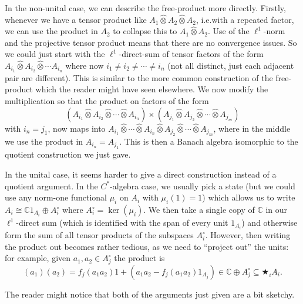 \documentclass[a4paper,11pt]{article}
\newcommand{\proten}{\widehat\otimes}
\theoremstyle{definition}
\begin{document}
In the non-unital case, we can describe the free-product more directly.  Firstly, whenever we have a tensor product like $A_1 \proten A_2 \proten A_2$, i.e.\@ with a repeated factor, we can use the product in $A_2$ to collapse this to $A_1 \proten A_2$.  Use of the $\ell^1$-norm and the projective tensor product means that there are no convergence issues.  So we could just start with the $\ell^1$-direct-sum of tensor factors of the form 
$A_{i_1}\proten A_{i_2}\proten\cdots A_{i_n}$ where now $i_1\not=i_2\not=\cdots\not=i_n$ (not all distinct, just each adjacent pair are different).  This is similar to the more common construction of the free-product which the reader might have seen elsewhere.  We now modify the multiplication so that the product on factors of the form
\[ (A_{i_1}\proten A_{i_2}\proten\cdots\proten A_{i_n}) \times (A_{j_1}\proten A_{j_2}\proten\cdots\proten A_{j_m}) \]
with $i_n = j_1$, now maps into $A_{i_1}\proten\cdots\proten A_{i_n} \proten A_{j_2} \proten\cdots\proten A_{j_m}$, where in the middle we use the product in $A_{i_n} = A_{j_1}$.  This is then a Banach algebra isomorphic to the quotient construction we just gave.

In the unital case, it seems harder to give a direct construction instead of a quotient argument.  In the $C^*$-algebra case, we usually pick a state (but we could use any norm-one functional $\mu_i$ on $A_i$ with $\mu_i(1)=1$) which allows us to write $A_i \cong \mathbb C1_{A_i} \oplus A_i^\circ$ where $A_i^\circ = \ker(\mu_i)$.  We then take a single copy of $\mathbb C$ in our $\ell^1$-direct sum (which is identified with the span of every unit $1_{A_i}$) and otherwise form the sum of all tensor products of the subspaces $A_i^\circ$.  However, then writing the product out becomes rather tedious, as we need to ``project out'' the units: for example, given $a_1, a_2 \in A_{j}^\circ$ the product is
\[ (a_1)(a_2) = f_j(a_1a_2)1 + (a_1a_2 - f_j(a_1a_2)1_{A_j}) \in \mathbb C \oplus A_j^\circ \subseteq \bigstar_i A_i. \]

The reader might notice that both of the arguments just given are a bit sketchy.
\end{document}
